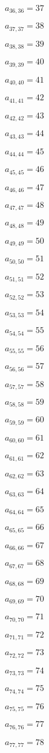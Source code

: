 \documentclass[a4paper,12pt]{article}
\begin{document}
$a _{ 36, 36 } = 37$

$a _{ 37, 37 } = 38$

$a _{ 38, 38 } = 39$

$a _{ 39, 39 } = 40$

$a _{ 40, 40 } = 41$

$a _{ 41, 41 } = 42$

$a _{ 42, 42 } = 43$

$a _{ 43, 43 } = 44$

$a _{ 44, 44 } = 45$

$a _{ 45, 45 } = 46$

$a _{ 46, 46 } = 47$

$a _{ 47, 47 } = 48$

$a _{ 48, 48 } = 49$

$a _{ 49, 49 } = 50$

$a _{ 50, 50 } = 51$

$a _{ 51, 51 } = 52$

$a _{ 52, 52 } = 53$

$a _{ 53, 53 } = 54$

$a _{ 54, 54 } = 55$

$a _{ 55, 55 } = 56$

$a _{ 56, 56 } = 57$

$a _{ 57, 57 } = 58$

$a _{ 58, 58 } = 59$

$a _{ 59, 59 } = 60$

$a _{ 60, 60 } = 61$

$a _{ 61, 61 } = 62$

$a _{ 62, 62 } = 63$

$a _{ 63, 63 } = 64$

$a _{ 64, 64 } = 65$

$a _{ 65, 65 } = 66$

$a _{ 66, 66 } = 67$

$a _{ 67, 67 } = 68$

$a _{ 68, 68 } = 69$

$a _{ 69, 69 } = 70$

$a _{ 70, 70 } = 71$

$a _{ 71, 71 } = 72$

$a _{ 72, 72 } = 73$

$a _{ 73, 73 } = 74$

$a _{ 74, 74 } = 75$

$a _{ 75, 75 } = 76$

$a _{ 76, 76 } = 77$

$a _{ 77, 77 } = 78$
\end{document}

